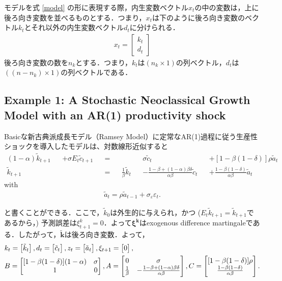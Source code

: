 \documentclass[a4j, dvipdfmx]{jarticle}
\begin{document}
モデルを式 \eqref{model} の形に表現する際，内生変数ベクトル$x_t$の中の変数は，上に後ろ向き変数を並べるものとする．つまり，$x_t$は下のように後ろ向き変数のベクトル$k_t$とそれ以外の内生変数ベクトル$d_t$に分けられる．
\begin{align}
x_t = \begin{bmatrix}k_t \\ d_t\end{bmatrix}\label{xkd}
\end{align}
後ろ向き変数の数を$n_k$とする．つまり，$k_t$は$(n_k \times 1)$の列ベクトル，$d_t$は$((n-n_k)\times 1)$の列ベクトルである． 

\subsection{Example 1: A Stochastic Neoclassical Growth Model with an AR(1) productivity shock}
Basicな新古典派成長モデル（Ramsey Model）に定常なAR(1)過程に従う生産性ショックを導入したモデルは、対数線形近似すると
\begin{align}
[1-\beta(1-\delta)](1-\alpha)\tilde k_{t+1}& &+\sigma E_t\tilde c_{t+1}& &=& & & &\sigma \tilde c_t& &+[1-\beta(1-\delta)]\rho \tilde a_t\\
\tilde k_{t+1}& & & &=& &\frac{1}{\beta}\tilde k_t& &-\frac{1-\beta+(1-\alpha)\beta\delta}{\alpha\beta}\tilde c_t& &+\frac{1-\beta(1-\delta)}{\alpha\beta}\tilde a_t
\end{align}
with
\begin{align*}
\tilde a_t = \rho \tilde a_{t-1} + \sigma_\varepsilon \varepsilon_t.
\end{align*}

と書くことができる．ここで，$\tilde k_0$は外生的に与えられ，かつ ($E_t\tilde k_{t+1} = \tilde k_{t+1}$であるから，) 予測誤差は$\xi^k_{t+1} = 0$．よって$ \boldsymbol{\xi^k}$はexogenous difference martingaleである．したがって，$\boldsymbol{\tilde k}$は後ろ向き変数．よって，
\begin{align}
&k_t = \begin{bmatrix}\tilde k_t\end{bmatrix}, d_t = \begin{bmatrix}\tilde c_t\end{bmatrix}, z_t = \begin{bmatrix}\tilde a_t\end{bmatrix},\xi_{t+1} = \begin{bmatrix}0\end{bmatrix},\notag \\
&B = \begin{bmatrix}[1-\beta(1-\delta)](1-\alpha) & \sigma \\
1 & 0 \end{bmatrix}, 
A = \begin{bmatrix}0 & \sigma \\
\frac{1}{\beta} & -\frac{1-\beta+(1-\alpha)\beta\delta}{\alpha\beta}\end{bmatrix},
C = \begin{bmatrix}[1-\beta(1-\delta)]\rho \\ \frac{1-\beta(1-\delta)}{\alpha\beta}\end{bmatrix}.
\end{align}
\end{document}
